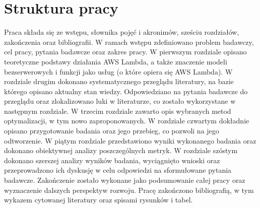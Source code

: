 \section*{Struktura pracy}\label{chapter:struktura_pracy}

Praca składa się ze wstępu, słownika pojęć i akronimów, sześciu rozdziałów, zakończenia oraz bibliografii.
W ramach wstępu zdefiniowano problem badawczy, cel pracy, pytania badawcze oraz zakres pracy.
W pierwszym rozdziale opisano teoretyczne podstawy działania AWS Lambda, a także znaczenie modeli bezserwerowych i funkcji jako usług (o które opiera się AWS Lambda).
W rozdziale drugim dokonano systematycznego przeglądu literatury, na bazie którego opisano aktualny stan wiedzy.
Odpowiedziano na pytania badawcze do przeglądu oraz zlokalizowano luki w literaturze, co zostało wykorzystane w następnym rozdziale.
W trzecim rozdziale zawarto opis wybranych metod optymalizacji, w tym nowo zaproponowanych.
W rozdziale czwartym dokładnie opisano przygotowanie badania oraz jego przebieg, co pozwoli na jego odtworzenie.
W piątym rozdziale przedstawiono wyniki wykonanego badania oraz dokonano obiektywnej analizy poszczególnych metryk.
W rozdziale szóstym dokonano szerszej analizy wyników badania, wyciągnięto wnioski oraz przeprowadzono ich dyskusję w celu odpowiedzi na sformułowane pytania badawcze.
Zakończenie zostało wykonane jako podsumowanie całej pracy oraz wyznaczenie dalszych perspektyw rozwoju.
Pracę zakończono bibliografią, w tym wykazem cytowanej literatury oraz spisami rysunków i tabel.
